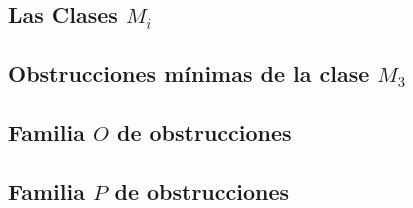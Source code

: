     \subsection{Las Clases $M_i$}

    \subsection{Obstrucciones mínimas de la clase $M_3$}
        

    \subsection{Familia $O$ de obstrucciones}

    \subsection{Familia $P$ de obstrucciones}
